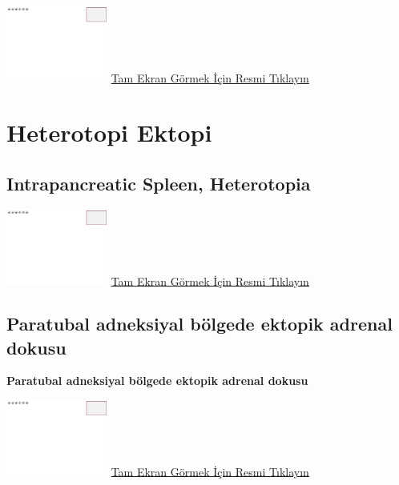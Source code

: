\documentclass[
  letterpaper,
  DIV=11,
  numbers=noendperiod]{scrreprt}
\begin{document}
\href{https://images.patolojiatlasi.com/template/HE.html}{\includegraphics[width=0.25\textwidth,height=\textheight]{./screenshots/template_screenshot.png}}
\href{https://images.patolojiatlasi.com/schwanncellhamartoma/HE.html}{Tam
Ekran Görmek İçin Resmi Tıklayın}

\hypertarget{sec-heterotopi-ektopi}{%
\chapter{Heterotopi Ektopi}\label{sec-heterotopi-ektopi}}

\hypertarget{sec-intrapancreatic-spleen}{%
\section{Intrapancreatic Spleen,
Heterotopia}\label{sec-intrapancreatic-spleen}}

\href{https://images.patolojiatlasi.com/template/HE.html}{\includegraphics[width=0.25\textwidth,height=\textheight]{./screenshots/template_screenshot.png}}
\href{https://images.patolojiatlasi.com/intrapancreaticspleen/HE.html}{Tam
Ekran Görmek İçin Resmi Tıklayın}

\hypertarget{sec-paratubal-adneksiyal-bolgede-ektopik-adrenal}{%
\section{Paratubal adneksiyal bölgede ektopik adrenal
dokusu}\label{sec-paratubal-adneksiyal-bolgede-ektopik-adrenal}}

\textbf{Paratubal adneksiyal bölgede ektopik adrenal dokusu}

\href{https://images.patolojiatlasi.com/template/HE.html}{\includegraphics[width=0.25\textwidth,height=\textheight]{./screenshots/template_screenshot.png}}
\href{https://images.patolojiatlasi.com/ectopic-adrenal/HE.html}{Tam
Ekran Görmek İçin Resmi Tıklayın}
\end{document}
